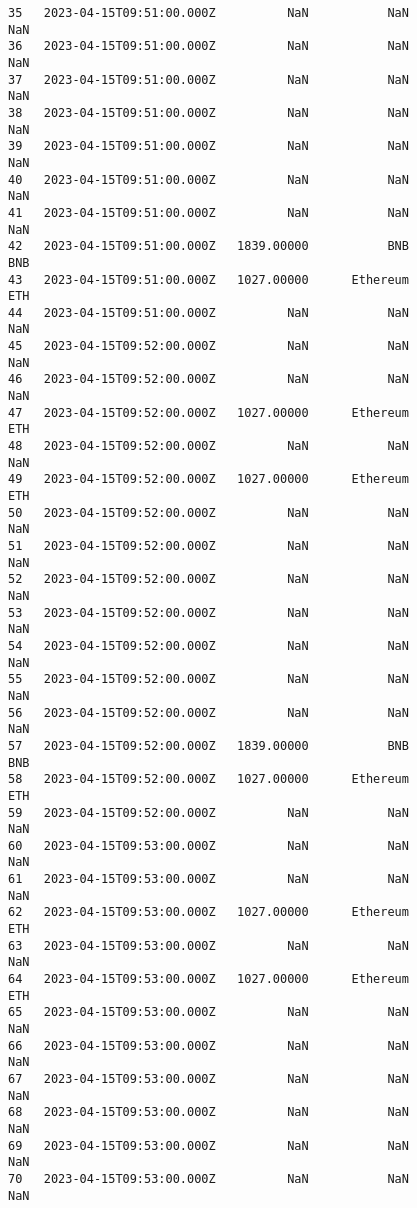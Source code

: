 \documentclass[11pt]{article}
\begin{document}
\begin{tcolorbox}[breakable, size=fbox, boxrule=.5pt, pad at break*=1mm, opacityfill=0]
\begin{Verbatim}[commandchars=\\\{\}]
35   2023-04-15T09:51:00.000Z          NaN           NaN             NaN
36   2023-04-15T09:51:00.000Z          NaN           NaN             NaN
37   2023-04-15T09:51:00.000Z          NaN           NaN             NaN
38   2023-04-15T09:51:00.000Z          NaN           NaN             NaN
39   2023-04-15T09:51:00.000Z          NaN           NaN             NaN
40   2023-04-15T09:51:00.000Z          NaN           NaN             NaN
41   2023-04-15T09:51:00.000Z          NaN           NaN             NaN
42   2023-04-15T09:51:00.000Z   1839.00000           BNB             BNB
43   2023-04-15T09:51:00.000Z   1027.00000      Ethereum             ETH
44   2023-04-15T09:51:00.000Z          NaN           NaN             NaN
45   2023-04-15T09:52:00.000Z          NaN           NaN             NaN
46   2023-04-15T09:52:00.000Z          NaN           NaN             NaN
47   2023-04-15T09:52:00.000Z   1027.00000      Ethereum             ETH
48   2023-04-15T09:52:00.000Z          NaN           NaN             NaN
49   2023-04-15T09:52:00.000Z   1027.00000      Ethereum             ETH
50   2023-04-15T09:52:00.000Z          NaN           NaN             NaN
51   2023-04-15T09:52:00.000Z          NaN           NaN             NaN
52   2023-04-15T09:52:00.000Z          NaN           NaN             NaN
53   2023-04-15T09:52:00.000Z          NaN           NaN             NaN
54   2023-04-15T09:52:00.000Z          NaN           NaN             NaN
55   2023-04-15T09:52:00.000Z          NaN           NaN             NaN
56   2023-04-15T09:52:00.000Z          NaN           NaN             NaN
57   2023-04-15T09:52:00.000Z   1839.00000           BNB             BNB
58   2023-04-15T09:52:00.000Z   1027.00000      Ethereum             ETH
59   2023-04-15T09:52:00.000Z          NaN           NaN             NaN
60   2023-04-15T09:53:00.000Z          NaN           NaN             NaN
61   2023-04-15T09:53:00.000Z          NaN           NaN             NaN
62   2023-04-15T09:53:00.000Z   1027.00000      Ethereum             ETH
63   2023-04-15T09:53:00.000Z          NaN           NaN             NaN
64   2023-04-15T09:53:00.000Z   1027.00000      Ethereum             ETH
65   2023-04-15T09:53:00.000Z          NaN           NaN             NaN
66   2023-04-15T09:53:00.000Z          NaN           NaN             NaN
67   2023-04-15T09:53:00.000Z          NaN           NaN             NaN
68   2023-04-15T09:53:00.000Z          NaN           NaN             NaN
69   2023-04-15T09:53:00.000Z          NaN           NaN             NaN
70   2023-04-15T09:53:00.000Z          NaN           NaN             NaN

\end{Verbatim}
\end{tcolorbox}
\end{document}
